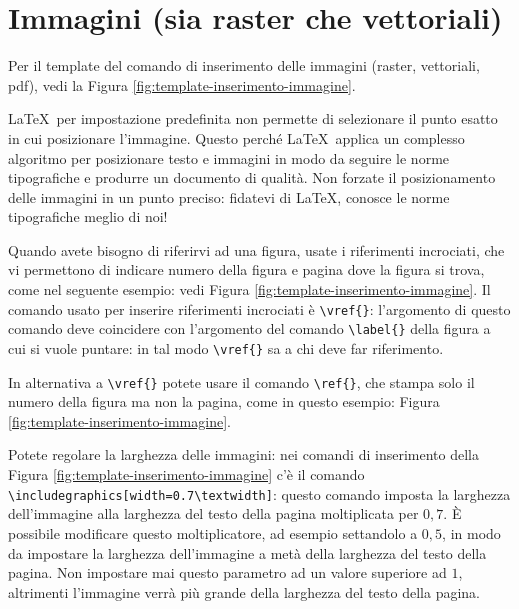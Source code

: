 \section{Immagini (sia raster che vettoriali)}

Per il template del comando di inserimento delle immagini (raster, vettoriali, pdf), vedi la Figura \vref{fig:template-inserimento-immagine}.

\LaTeX\ per impostazione predefinita non permette di selezionare il punto esatto in cui posizionare l'immagine. Questo perché \LaTeX\ applica un complesso algoritmo per posizionare testo e immagini in modo da seguire le norme tipografiche e produrre un documento di qualità. Non forzate il posizionamento delle immagini in un punto preciso: fidatevi di \LaTeX , conosce le norme tipografiche meglio di noi!

Quando avete bisogno di riferirvi ad una figura, usate i riferimenti incrociati, che vi permettono di indicare numero della figura e pagina dove la figura si trova, come nel seguente esempio: vedi Figura \vref{fig:template-inserimento-immagine}. Il comando usato per inserire riferimenti incrociati è \verb!\vref{}!: l'argomento di questo comando deve coincidere con l'argomento del comando \verb!\label{}! della figura a cui si vuole puntare: in tal modo \verb!\vref{}! sa a chi deve far riferimento.

In alternativa a \verb!\vref{}! potete usare il comando \verb!\ref{}!, che stampa solo il numero della figura ma non la pagina, come in questo esempio: Figura \ref{fig:template-inserimento-immagine}.

Potete regolare la larghezza delle immagini: nei comandi di inserimento della Figura \ref{fig:template-inserimento-immagine} c'è il comando \verb!\includegraphics[width=0.7\textwidth]!: questo comando imposta la larghezza dell'immagine alla larghezza del testo della pagina moltiplicata per $0,7$. È possibile modificare questo moltiplicatore, ad esempio settandolo a $0,5$, in modo da impostare la larghezza dell'immagine a metà della larghezza del testo della pagina. Non impostare mai questo parametro ad un valore superiore ad $1$, altrimenti l'immagine verrà più grande della larghezza del testo della pagina.

